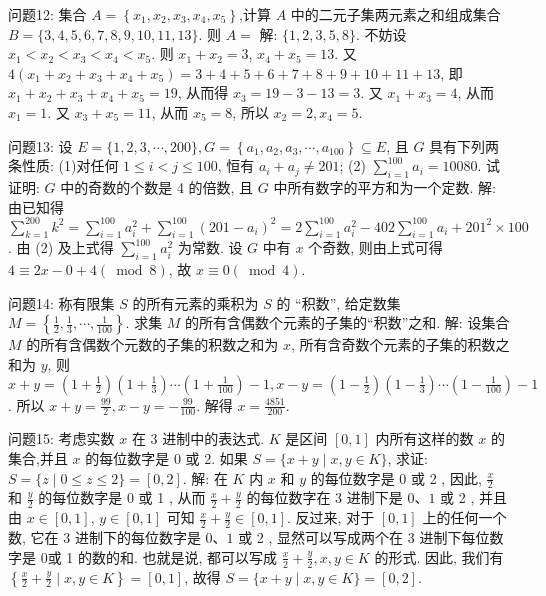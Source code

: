 问题12: 集合 $A=\left\{x_1, x_2, x_3, x_4, x_5\right\}$,计算 $A$ 中的二元子集两元素之和组成集合 $B=\{3,4,5,6,7,8,9,10,11,13\}$. 则 $A=$
解: $\{1,2,3,5,8\}$. 不妨设 $x_1<x_2<x_3<x_4<x_5$. 则 $x_1+x_2=3$, $x_4+x_5=13$. 又 $4\left(x_1+x_2+x_3+x_4+x_5\right)=3+4+5+6+7+8+9+10+11+13$, 即 $x_1+x_2+x_3+x_4+x_5=19$, 从而得 $x_3=19-3-13=3$. 又 $x_1+ x_3=4$, 从而 $x_1=1$. 又 $x_3+x_5=11$, 从而 $x_5=8$, 所以 $x_2=2, x_4=5$.



问题13: 设 $E=\{1,2,3, \cdots, 200\}, G=\left\{a_1, a_2, a_3, \cdots, a_{100}\right\} \subseteq E$, 且 $G$ 具有下列两条性质:
(1)对任何 $1 \leqslant i<j \leqslant 100$, 恒有 $a_i+a_j \neq 201$;
(2) $\sum_{i=1}^{100} a_i=10080$.
试证明: $G$ 中的奇数的个数是 4 的倍数, 且 $G$ 中所有数字的平方和为一个定数.
解: 由已知得 $\sum_{k=1}^{200} k^2=\sum_{i=1}^{100} a_i^2+\sum_{i=1}^{100}\left(201-a_i\right)^2=2 \sum_{i=1}^{100} a_i^2-402 \sum_{i=1}^{100} a_i+201^2 \times 100$. 由 (2) 及上式得 $\sum_{i=1}^{100} a_i^2$ 为常数.
设 $G$ 中有 $x$ 个奇数, 则由上式可得 $4 \equiv 2 x-0+4(\bmod 8)$, 故 $x \equiv 0(\bmod 4)$.



问题14: 称有限集 $S$ 的所有元素的乘积为 $S$ 的 “积数”, 给定数集 $M= \left\{\frac{1}{2}, \frac{1}{3}, \cdots, \frac{1}{100}\right\}$. 求集 $M$ 的所有含偶数个元素的子集的“积数”之和.
解: 设集合 $M$ 的所有含偶数个元数的子集的积数之和为 $x$, 所有含奇数个元素的子集的积数之和为 $y$, 则 $x+y=\left(1+\frac{1}{2}\right)\left(1+\frac{1}{3}\right) \cdots\left(1+\frac{1}{100}\right)-1, x-y=\left(1-\frac{1}{2}\right)\left(1-\frac{1}{3}\right) \cdots\left(1-\frac{1}{100}\right)-1$. 所以 $x+y=\frac{99}{2}, x-y= -\frac{99}{100}$. 解得 $x=\frac{4851}{200}$.



问题15: 考虑实数 $x$ 在 3 进制中的表达式.
$K$ 是区间 $[0,1]$ 内所有这样的数 $x$ 的集合,并且 $x$ 的每位数字是 0 或 2. 如果 $S=\{x+y \mid x, y \in K\}$, 求证: $S=\{z \mid 0 \leqslant z \leqslant 2\}=[0,2]$.
解: 在 $K$ 内 $x$ 和 $y$ 的每位数字是 0 或 2 , 因此, $\frac{x}{2}$ 和 $\frac{y}{2}$ 的每位数字是 0 或 1 , 从而 $\frac{x}{2}+\frac{y}{2}$ 的每位数字在 3 进制下是 $0 、 1$ 或 2 , 并且由 $x \in[0,1]$, $y \in[0,1]$ 可知 $\frac{x}{2}+\frac{y}{2} \in[0,1]$. 反过来, 对于 $[0,1]$ 上的任何一个数, 它在 3 进制下的每位数字是 $0 、 1$ 或 2 , 显然可以写成两个在 3 进制下每位数字是 0或 1 的数的和.
也就是说, 都可以写成 $\frac{x}{2}+\frac{y}{2}, x, y \in K$ 的形式.
因此, 我们有 $\left\{\frac{x}{2}+\frac{y}{2} \mid x, y \in K\right\}=[0,1]$, 故得 $S=\{x+y \mid x, y \in K\}=[0,2]$.



